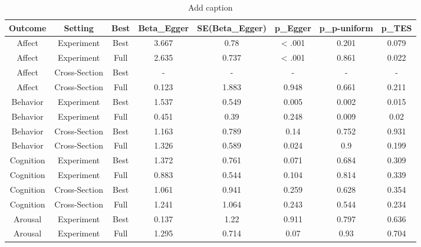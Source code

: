 \begin{table}[htbp]
  \centering
  \caption{Add caption}
    \begin{tabular}{cccccccc}
    \toprule
    Outcome & Setting & Best  & Beta\_{Egger} & SE(Beta\_{Egger}) & p\_{Egger} & p\_{p-uniform} & p\_{TES} \\
    \midrule
    Affect & Experiment & Best  & 3.667 & 0.78  & < .001 & 0.201 & 0.079 \\
    Affect & Experiment & Full  & 2.635 & 0.737 & < .001 & 0.861 & 0.022 \\
    Affect & Cross-Section & Best  & -     & -     & -     & -     & - \\
    Affect & Cross-Section & Full  & 0.123 & 1.883 & 0.948 & 0.661 & 0.211 \\
    Behavior & Experiment & Best  & 1.537 & 0.549 & 0.005 & 0.002 & 0.015 \\
    Behavior & Experiment & Full  & 0.451 & 0.39  & 0.248 & 0.009 & 0.02 \\
    Behavior & Cross-Section & Best  & 1.163 & 0.789 & 0.14  & 0.752 & 0.931 \\
    Behavior & Cross-Section & Full  & 1.326 & 0.589 & 0.024 & 0.9   & 0.199 \\
    Cognition & Experiment & Best  & 1.372 & 0.761 & 0.071 & 0.684 & 0.309 \\
    Cognition & Experiment & Full  & 0.883 & 0.544 & 0.104 & 0.814 & 0.339 \\
    Cognition & Cross-Section & Best  & 1.061 & 0.941 & 0.259 & 0.628 & 0.354 \\
    Cognition & Cross-Section & Full  & 1.241 & 1.064 & 0.243 & 0.544 & 0.234 \\
    Arousal & Experiment & Best  & 0.137 & 1.22  & 0.911 & 0.797 & 0.636 \\
    Arousal & Experiment & Full  & 1.295 & 0.714 & 0.07  & 0.93  & 0.704 \\
    \bottomrule
    \end{tabular}%
  \label{tab:addlabel}%
\end{table}%
